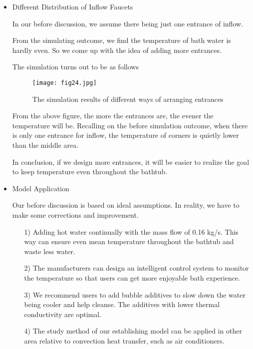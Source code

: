 \documentclass{mcmthesis}
\begin{document}
\begin{itemize}
\item Different Distribution of Inflow Faucets

In our before discussion, we assume there being just one entrance of inflow.

From the simulating outcome, we find the temperature of bath water is hardly even. So we come up with the idea of adding more entrances.

The simulation turns out to be as follows

\begin{figure}[h] 
\centering
\texttt{[image: fig24.jpg]}
\caption{The simulation results of different ways of arranging entrances} \label{fig24}
\end{figure}

From the above figure, the more the entrances are, the evener the temperature will be. Recalling on the before simulation outcome, when there is only one entrance for inflow, the temperature of corners is quietly lower than the middle area.

In conclusion, if we design more entrances, it will be easier to realize the goal to keep temperature even throughout the bathtub.

\item Model Application

Our before discussion is based on ideal assumptions. In reality, we have to make some corrections and improvement.

\begin{itemize}
\item[1)] Adding hot water continually with the mass flow of 0.16 kg/s. This way can ensure even mean temperature throughout the bathtub and waste less water.

\item[2)] The manufacturers can design an intelligent control system to monitor the temperature so that users can get more enjoyable bath experience.

\item[3)] We recommend users to add bubble additives to slow down the water being cooler and help cleanse. The additives with lower thermal conductivity are optimal.

\item[4)] The study method of our establishing model can be applied in other area relative to convection heat transfer, such as air conditioners.
\end{itemize}
\end{itemize}
\end{document}
